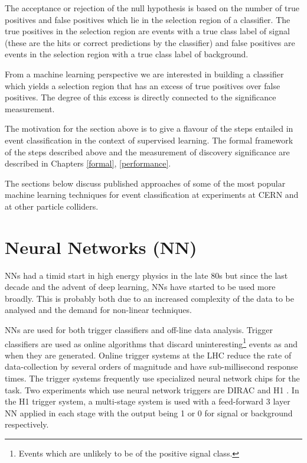 The acceptance or rejection of the null hypothesis is based on the number of true positives and false positives which lie in the selection region of a classifier. The true positives in the selection region are events with a true class label of signal (these are the hits or correct predictions by the classifier) and false positives are events in the selection region with a true class label of background.

From a machine learning perspective we are interested in building a classifier which yields a selection region that has an excess of true positives over false positives. The degree of this excess is directly connected to the significance measurement.

The motivation for the section above is to give a flavour of the steps entailed in event classification in the context of supervised learning. The formal framework of the steps described above and the measurement of discovery significance are described in Chapters \ref{formal}, \ref{performance}.

The sections below discuss published approaches of some of the most popular machine learning techniques for event classification at experiments at CERN and at other particle colliders. 

\section{Neural Networks (NN)}

NNs had a timid start in high energy physics in the late 80s but since the last decade and the advent of deep learning, NNs have started to be used more broadly. This is probably both due to an increased complexity of the data to be analysed and the demand for non-linear techniques. 

NNs are used for both trigger classifiers and off-line data analysis. Trigger classifiers are used as online algorithms that discard uninteresting\footnote{Events which are unlikely to be of the positive signal class.} events as and when they are generated. Online trigger systems at the LHC reduce the rate of data-collection by several orders of magnitude and have sub-millisecond response times. The trigger systems frequently use specialized neural network chips for the task. Two experiments which use neural network triggers are DIRAC \cite{dirac} and H1 \cite{h1}. In the H1 trigger system, a multi-stage system is used with a feed-forward 3 layer NN applied in each stage with the output being 1 or 0 for signal or background respectively. 

